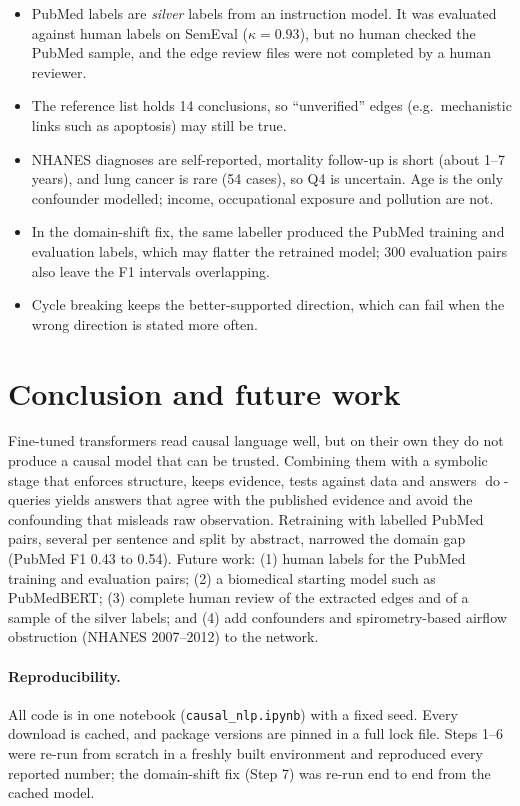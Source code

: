 \documentclass[11pt,a4paper]{article}
\newcommand{\doop}{\operatorname{do}}
\begin{document}
\begin{itemize}
  \item PubMed labels are \emph{silver} labels from an instruction model. It was evaluated against human labels on SemEval
        ($\kappa = 0.93$), but no human checked the PubMed sample, and the edge review files were not completed by a human reviewer.
  \item The reference list holds 14 conclusions, so ``unverified'' edges (e.g.\ mechanistic links such as apoptosis) may still be true.
  \item NHANES diagnoses are self-reported, mortality follow-up is short (about 1--7 years), and lung cancer is rare (54 cases), so Q4 is
        uncertain. Age is the only confounder modelled; income, occupational exposure and pollution are not.
  \item In the domain-shift fix, the same labeller produced the PubMed training and evaluation labels, which may flatter the
        retrained model; 300 evaluation pairs also leave the F1 intervals overlapping.
  \item Cycle breaking keeps the better-supported direction, which can fail when the wrong direction is stated more often.
\end{itemize}

\section{Conclusion and future work}

Fine-tuned transformers read causal language well, but on their own they do not produce a causal model that can be trusted. Combining
them with a symbolic stage that enforces structure, keeps evidence, tests against data and answers $\doop$-queries yields answers that
agree with the published evidence and avoid the confounding that misleads raw observation. Retraining with labelled PubMed pairs, several per sentence and split
by abstract, narrowed the domain gap (PubMed F1 0.43 to 0.54). Future work: (1) human labels for the PubMed training and evaluation pairs;
(2) a biomedical starting model such as PubMedBERT; (3) complete human review of the extracted edges and of a sample of the silver labels; and (4) add confounders
and spirometry-based airflow obstruction (NHANES 2007--2012) to the network.

\paragraph{Reproducibility.} All code is in one notebook (\texttt{causal\_nlp.ipynb}) with a fixed seed. Every download is cached, and package
versions are pinned in a full lock file. Steps 1--6 were re-run from scratch in a freshly built environment and reproduced every reported number; the domain-shift fix
(Step 7) was re-run end to end from the cached model.
\end{document}
